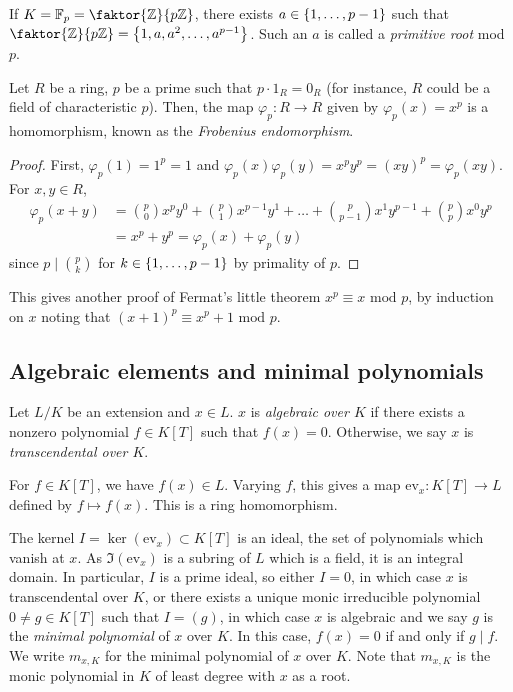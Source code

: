 \begin{remark}
	If \( K = \mathbb F_p = \faktor{\mathbb Z}{p\mathbb Z} \), there exists \( a \in \qty{1, \dots, p-1} \) such that \( \faktor{\mathbb Z}{p\mathbb Z} = \qty{1, a, a^2, \dots, a^{p-1}} \).
	Such an \( a \) is called a \emph{primitive root} mod \( p \).
\end{remark}
\begin{proposition}
	Let \( R \) be a ring, \( p \) be a prime such that \( p \cdot 1_R = 0_R \) (for instance, \( R \) could be a field of characteristic \( p \)).
	Then, the map \( \varphi_p \colon R \to R \) given by \( \varphi_p(x) = x^p \) is a homomorphism, known as the \emph{Frobenius endomorphism}.
\end{proposition}
\begin{proof}
	First, \( \varphi_p(1) = 1^p = 1 \) and \( \varphi_p(x)\varphi_p(y) = x^p y^p = (xy)^p = \varphi_p(xy) \).
	For \( x,y \in R \),
	\begin{align*}
		\varphi_p(x + y) &= \binom p 0 x^p y^0 + \binom p 1 x^{p-1} y^1 + \dots + \binom p {p-1} x^1 y^{p-1} + \binom p p x^0 y^p \\
		&= x^p + y^p = \varphi_p(x) + \varphi_p(y)
	\end{align*}
	since \( p \mid \binom p k \) for \( k \in \qty{1, \dots, p-1} \) by primality of \( p \).
\end{proof}
\begin{example}
	This gives another proof of Fermat's little theorem \( x^p \equiv x \text{ mod } p \), by induction on \( x \) noting that \( (x+1)^p \equiv x^p + 1 \text{ mod } p \).
\end{example}

\subsection{Algebraic elements and minimal polynomials}
\begin{definition}
	Let \( L / K \) be an extension and \( x \in L \).
	\( x \) is \emph{algebraic over \( K \)} if there exists a nonzero polynomial \( f \in K[T] \) such that \( f(x) = 0 \).
	Otherwise, we say \( x \) is \emph{transcendental over \( K \)}.
\end{definition}
For \( f \in K[T] \), we have \( f(x) \in L \).
Varying \( f \), this gives a map \( \mathrm{ev}_x \colon K[T] \to L \) defined by \( f \mapsto f(x) \).
This is a ring homomorphism.

The kernel \( I = \ker(\mathrm{ev}_x) \subset K[T] \) is an ideal, the set of polynomials which vanish at \( x \).
As \( \Im(\mathrm{ev}_x) \) is a subring of \( L \) which is a field, it is an integral domain.
In particular, \( I \) is a prime ideal, so either \( I = 0 \), in which case \( x \) is transcendental over \( K \), or there exists a unique monic irreducible polynomial \( 0 \neq g \in K[T] \) such that \( I = (g) \), in which case \( x \) is algebraic and we say \( g \) is the \emph{minimal polynomial} of \( x \) over \( K \).
In this case, \( f(x) = 0 \) if and only if \( g \mid f \).
We write \( m_{x,K} \) for the minimal polynomial of \( x \) over \( K \).
Note that \( m_{x,K} \) is the monic polynomial in \( K \) of least degree with \( x \) as a root.

